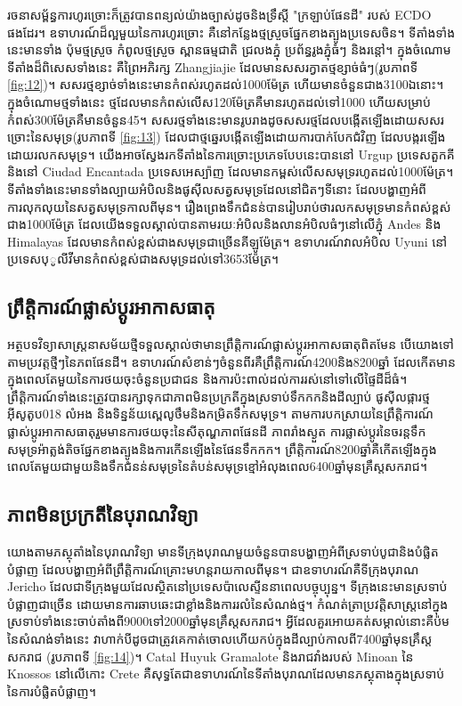 \documentclass[10pt,twocolumn,letterpaper]{article}
\begin{document}
រចនាសម្ព័ន្ធការហូរច្រោះក៏ត្រូវបានពន្យល់យ៉ាងច្បាស់ដូចនិងទ្រឹស្តី "ក្រឡាប់ផែនដី" របស់ ECDO ផងដែរ។ ឧទាហរណ៍ដ៏ល្អមួយនៃការហូរច្រោះ គឺនៅកន្លែងថ្មស្រួចផ្នែកខាងត្បូងប្រទេសចិន\cite{82}។ ទីតាំងទាំងនេះមានទាំង ប៉ុមថ្មស្រួច កំពូលថ្មស្រួច ស្ពានធម្មជាតិ ជ្រលងភ្នុំ ប្រព័ន្ធរូងភ្នុំធំៗ និងរន្តៅ។ ក្នុងចំណោមទីតាំងដ៏ពិសេសទាំងនេះ គឺព្រៃអភិរក្ស Zhangjiajie ដែលមានសសរក្វាតថ្មខ្សាច់ធំៗ(រូបភាពទី \ref{fig:12})\cite{84}។ សសរថ្មខ្សាច់ទាំងនេះមានកំពស់រហូតដល់1000ម៉ែត្រ ហើយមានចំនួនជាង3100ឯនោះ។ ក្នុងចំណោមថ្មទាំងនេះ ថ្មដែលមានកំពស់លើស120ម៉ែត្រគឺមានរហូតដល់ទៅ1000 ហើយសម្រាប់កំពស់300ម៉ែត្រគឺមានចំនួន45\cite{85}។ សសរថ្មទាំងនេះមានរូបរាងដូចសសរថ្មដែលបង្កើតឡើងដោយសសរច្រោះនៃសមុទ្រ(រូបភាពទី \ref{fig:13}) ដែលជាថ្មឆ្នេរបង្កើតឡើងដោយការបាក់បែកជំវិញ ដែលបង្ករឡើងដោយរលកសមុទ្រ។ យើងអាចស្វែងរកទីតាំងនៃការច្រោះប្រភេទបែបនេះបាននៅ Urgup ប្រទេសតួកគី និងនៅ Ciudad Encantada ប្រទេសអេស្ប៉ាញ ដែលមានកម្ពស់លើសសមុទ្ររហូតដល់1000ម៉ែត្រ។ ទីតាំងទាំងនេះមានទាំងល្បាយអំបិលនិងផូសុីលសត្វសមុទ្រដែលនៅជិតៗទីនោះ ដែលបង្ហាញអំពីការលុកលុយនៃសត្វសមុទ្រកាលពីមុន\cite{15,86,87}។ រឿងព្រេងទឹកជំនន់\cite{3}បានរៀបរាប់ថារលកសមុទ្រមានកំពស់ខ្ពស់ជាង1000ម៉ែត្រ ដែលយើងទទួលស្គាល់បានតាមរយៈអំបិលនិងលានអំបិលធំៗនៅលើភ្នុំ Andes និង Himalayas ដែលមានកំពស់ខ្ពស់ជាងសមុទ្រជាច្រើនគីឡូម៉ែត្រ។ ឧទាហរណ៍វាលអំបិល Uyuni នៅប្រទេសបុូលីវីមានកំពស់ខ្ពស់ជាងសមុទ្រដល់ទៅ3653ម៉ែត្រ\cite{94}។

\subsection{ព្រឹត្តិការណ៍ផ្លាស់ប្ដូរអាកាសធាតុ}

អត្ថបទវិទ្យាសាស្ត្រនាសម័យថ្មីទទួលស្គាល់ថាមានព្រឹត្តិការណ៍ផ្លាស់ប្ដូរអាកាសធាតុពិតមែន បើយោងទៅតាមប្រវត្តថ្មីៗនៃភពផែនដី។ ឧទាហរណ៍សំខាន់ៗចំនួនពីរគឺព្រឹត្តិការណ៍4200និង8200ឆ្នាំ ដែលកើតមានក្នុងពេលតែមួយនៃការថយចុះចំនួនប្រជាជន និងការប៉ះពាល់ដល់ការរស់នៅទៅលើផ្ទៃដីដ៏ធំ។ ព្រឹត្តិការណ៍ទាំងនេះត្រូវបានរក្សាទុកជាភាពមិនប្រក្រតីក្នុងស្រទាប់ទឹកកកនិងដីល្បាប់ ផូសុីលផ្ការថ្ម អុីសូតូប018 លំអង និងទិន្នន័យស្ពេលូថឹមនិងកម្រិតទឹកសមុទ្រ។ តាមការបកស្រាយនៃព្រឹត្តិការណ៍ផ្លាស់ប្ដូរអាកាសធាតុរួមមានការថយចុះនៃសីតុណ្ហភាពផែនដី ភាពរាំងស្ងួត ការផ្លាស់ប្តូរនៃចរន្តទឹកសមុទ្រអ៉ាត្លង់តិចផ្នែកខាងត្បូងនិងការកើនឡើងនៃផែនទឹកកក\cite{90,91,92}។ ព្រឹត្តិការណ៍8200ឆ្នាំគឺកើតឡើងក្នុងពេលតែមួយជាមួយនិងទឹកជំនន់សមុទ្រនៃតំបន់សមុទ្រខ្មៅអំលុងពេល6400ឆ្នាំមុនគ្រឹស្តសករាជ\cite{93}។

\subsection{ភាពមិនប្រក្រតីនៃបុរាណវិទ្យា}

យោងតាមភស្ថុតាំងនៃបុរាណវិទ្យា មានទីក្រុងបុរាណមួយចំនួនបានបង្ហាញអំពីស្រទាប់បូជានិងបំផ្លិតបំផ្លាញ ដែលបង្ហាញអំពីព្រឹត្តិការណ៍គ្រោះមហន្តរាយកាលពីមុន។ ជាឧទាហរណ៍គឺទីក្រុងបុរាណ Jericho ដែលជាទីក្រុងមួយដែលស្ថិតនៅប្រទេសប៉ាលេស្ទីននាពេលបច្ចុប្បុន្ន។ ទីក្រុងនេះមានស្រទាប់បំផ្លាញជាច្រើន ដោយមានការឆាបឆេះជាខ្លាំងនិងការរលំនៃសំណង់ថ្ម\cite{96,97}។ កំណត់ត្រាប្រវត្តិសាស្ត្រនៅក្នុងស្រទាប់ទាំងនេះចាប់តាំងពី9000ទៅ2000ឆ្នាំមុនគ្រឹស្តសករាជ។ អ្វីដែលគួរអោយគត់សម្គាល់នោះគឺប៉មនៃសំណង់ទាំងនេះ វាហាក់បីដូចជាត្រូវគេកាត់ចោលហើយកប់ក្នុងដីល្បាប់កាលពី7400ឆ្នាំមុនគ្រឹស្តសករាជ (រូបភាពទី \ref{fig:14})\cite{95}។ Catal Huyuk \cite{99} Gramalote \cite{98} និងរាជវាំងរបស់ Minoan នៃ Knossos នៅលើកោះ Crete\cite{100,101} គឺសុទ្ធតែជាឧទាហរណ៍នៃទីតាំងបុរាណដែលមានភស្ថុតាងក្នុងស្រទាប់នៃការបំផ្លិតបំផ្លាញ។
\end{document}
